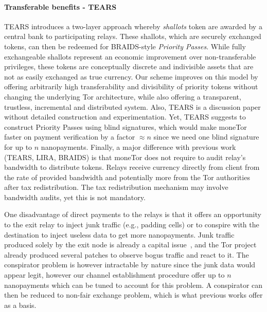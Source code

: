 \paragraph*{Transferable benefits - TEARS} TEARS introduces a two-layer approach whereby \emph{shallots}
token are awarded by a central bank to participating relays. These shallots,
which are securely exchanged tokens, can then be redeemed for BRAIDS-style
\emph{Priority Passes}. While fully exchangeable shallots represent an economic
improvement over non-transferable privileges, these tokens are conceptually
discrete and indivisible assets that are not as easily exchanged as true
currency. Our scheme improves on this model by offering arbitrarily high
transferability and divisibility of priority tokens without changing the
underlying Tor architecture, while also offering a transparent, trustless, incremental and distributed system. Also, TEARS is a discussion paper without detailed construction and experimentation. Yet, TEARS suggests to construct Priority Passes using blind signatures, which would make moneTor faster on payment verification by a factor $\approx n$ since we need one blind signature for up to $n$ nanopayments. Finally, a major difference with previous work (TEARS, LIRA, BRAIDS) is that moneTor does not require to audit relay's bandwidth to distribute tokens. Relays receive currency directly from client from the rate of provided bandwidth and potentially more from the Tor authorities after tax redistribution. The tax redistribution mechanism may involve bandwidth audits, yet this is not mandatory.

One disadvantage of direct payments to the relays is that it offers 
an opportunity to the exit relay to inject junk traffic (e.g., 
padding cells) or to conspire with the destination to inject useless 
data to get more nanopayments. Junk traffic produced solely by the 
exit node is already a capital issue~\cite{rochet2018dropping}, and 
the Tor project already produced several patches to observe bogus 
traffic and react to it. The conspirator problem is however 
intractable by nature since the junk data would appear legit, 
however our channel establishment procedure offer up to $n$ 
nanopayments which can be tuned to account for this problem. 
A conspirator can then be reduced to 
non-fair exchange problem, which is what previous works offer as a basis.

